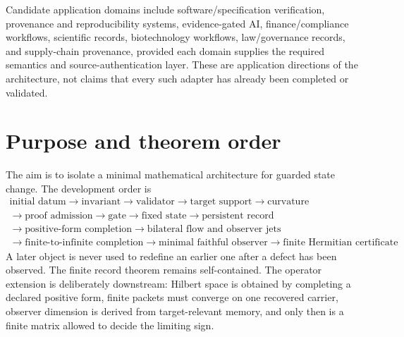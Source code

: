 Candidate application domains include software/specification verification, provenance and reproducibility systems, evidence-gated AI, finance/compliance workflows, scientific records, biotechnology workflows, law/governance records, and supply-chain provenance, provided each domain supplies the required semantics and source-authentication layer. These are application directions of the architecture, not claims that every such adapter has already been completed or validated.

\section{Purpose and theorem order}

The aim is to isolate a minimal mathematical architecture for guarded state change. The development order is
\begin{equation}
\boxed{
\begin{gathered}
\text{initial datum}\to
\text{invariant}\to
\text{validator}\to
\text{target support}\to
\text{curvature}\\
\to\text{proof admission}\to
\text{gate}\to
\text{fixed state}\to
\text{persistent record}\\
\to\text{positive-form completion}\to
\text{bilateral flow and observer jets}\\
\to\text{finite-to-infinite completion}\to
\text{minimal faithful observer}\to
\text{finite Hermitian certificate}
\end{gathered}}
\label{eq:chain}
\end{equation}
A later object is never used to redefine an earlier one after a defect has been observed. The finite record theorem remains self-contained. The operator extension is deliberately downstream: Hilbert space is obtained by completing a declared positive form, finite packets must converge on one recovered carrier, observer dimension is derived from target-relevant memory, and only then is a finite matrix allowed to decide the limiting sign.

